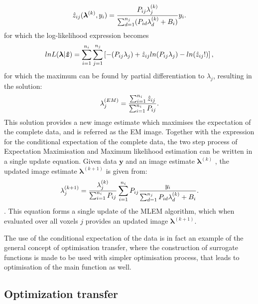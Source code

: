 \begin{equation}
\hat{z}_{ij}(\bm{\lambda}^{(k)},y_i) = 
\frac{P_{ij} \lambda_j^{(k)}}{\sum_{d=1}^{n_j} (P_{id}\lambda_d^{(k)} + B_i)}y_i\\.
\end{equation}
for which the log-likelihood expression becomes
\begin{equation}
lnL(\bm{\lambda}|\bm{\hat{z}})  =
\sum_{i=1}^{n_i} \sum_{j=1}^{n_j} \left[ -(P_{ij} \lambda_j) + \hat{z}_{ij} ln( P_{ij} \lambda_j ) - ln(\hat{z}_{ij}!) \right] \\,
\label{eqn:log_likelihood_z}
\end{equation}
for which the maximum can be found by partial differentiation to $\lambda_j$, resulting in the solution:
\begin{equation}
\lambda_j^{(EM)} = \frac{\sum_{i=1}^{n_i} \hat{z}_{ij} }{\sum_{i=1}^{n_i} P_{ij} } \\.
\label{eqn:EMupdate}
\end{equation}
This solution provides a new image estimate which maximises the expectation of the complete data, and is referred as the EM image. 
Together with the expression for the conditional expectation of the complete data, the two step process of Expectation Maximisation and  Maximum likelihood estimation can be written in a single update equation. Given data $\bm{y}$ and an image estimate $\bm{\lambda}^{(k)}$ , the updated image estimate $\bm{\lambda}^{(k+1)}$ is given from:
\begin{equation}
\lambda_j^{(k+1)} = \frac{\lambda_j^{(k)}}{\sum_{i=1}^{n_i} P_{ij}} 
\sum_{i=1}^{n_i} P_{ij} 
\frac{y_i}{\sum_{d=1}^{n_j} P_{id}\lambda_d^{(k)} + B_i } \\.
\label{eqn:MLEM}
\end{equation}. 
This equation forms a single update of the MLEM algorithm, which when evaluated over all voxels $j$ provides an updated image $\bm{\lambda}^{(k+1)}$. 

The use of the conditional expectation of the data is in fact an example of the general concept of optimisation transfer, where the construction of surrogate functions is made to be used with simpler optimisation process, that leads to optimisation of the main function as well.

\subsection{Optimization transfer}
%

